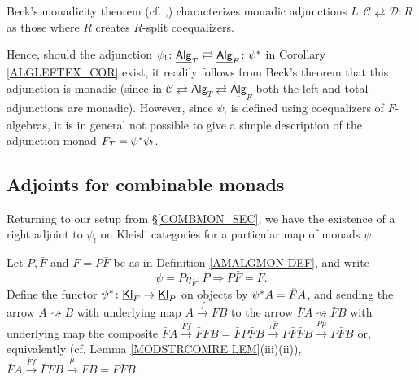 \documentclass[a4paper,10pt
]{article}%
\renewcommand{\1}{\eta}%
\newcommand{\Kl}{\underline{\mathsf{Kl}}}
\newcommand{\Alg}{\underline{\mathsf{Alg}}}
\begin{document}
\begin{remark}\label{ADJSRMON REM}
	Beck's monadicity theorem (cf. \cite[VI.7 Thm. 1]{McL},\cite[Thm. 5.5.1]{Ri17})
	characterizes monadic adjunctions $L\colon \mathcal{C} \rightleftarrows \mathcal{D}\colon R$
	as those where $R$ creates $R$-split coequalizers. 
	
	Hence, should the adjunction 
	$\psi_! \colon \Alg_T \rightleftarrows \Alg_F \colon \psi^{\**}$
	in Corollary \ref{ALGLEFTEX_COR} exist,
	it readily follows from Beck's theorem that this adjunction is monadic
	(since in 
	$\mathcal{C} \rightleftarrows
	\mathsf{Alg}_T \rightleftarrows
	\Alg_F$
	both the left and total adjunctions are monadic).
	However, since $\psi_!$ is defined using coequalizers of $F$-algebras,
	it is in general not possible to give a simple description of the adjunction monad
	$F_T = \psi^{\**} \psi_!$.
\end{remark}


\subsection{Adjoints for combinable monads}

Returning to our setup from \S \ref{COMBMON_SEC},
we have the existence of a right adjoint to $\psi_!$ on Kleisli categories for a particular map of monads $\psi$.

\begin{definition}
	Let $P,\bar{F}$ and $F = P \bar{F}$ be as in 
	Definition \ref{AMALGMON DEF},
	and write
	\[
	\psi = P\eta_{\bar F} \colon P \Rightarrow P \bar{F} = F.
	\]
	Define the functor
	$\psi^{\**} \colon \Kl_F \to \Kl_P$
	on objects by
	$\psi^{\**}A = \bar{F} A$,
	and sending the arrow
	$A \rightsquigarrow B$
	with underlying map
	$A \xrightarrow{f} FB$
	to the arrow 
	$\bar{F} A \rightsquigarrow \bar{F} B$
	with underlying map the composite
	$\bar{F} A \xrightarrow{\bar{F}f} \bar{F} FB
	=
	\bar{F}P \bar{F} B \xrightarrow{\tau \bar{F}}
	P \bar{F} \bar{F} B \xrightarrow{P \mu}
	P\bar{F}B$
	or, equivalently (cf. Lemma \ref{MODSTRCOMRE LEM}(iii)(ii)),
	$\bar{F} A \xrightarrow{\bar{F}f} \bar{F} FB
	\xrightarrow{\mu} FB = P\bar{F}B$.
\end{definition}
\end{document}
